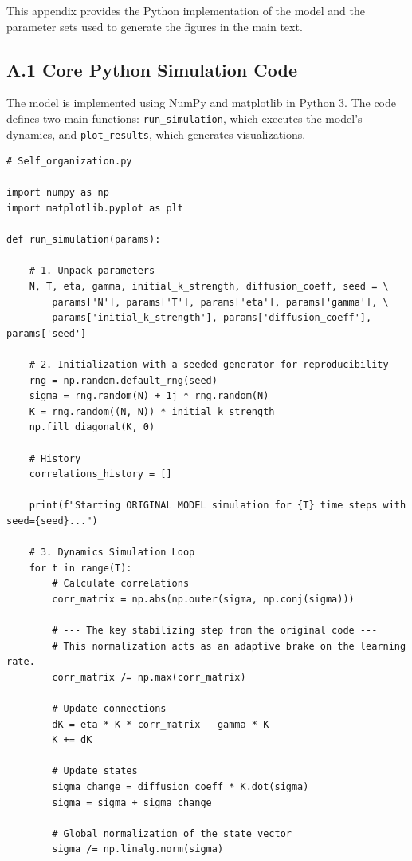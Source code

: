 \documentclass[12pt]{article}
\begin{document}
This appendix provides the Python implementation of the model and the parameter sets used to generate the figures in the main text.

\vspace{1em}

\subsection*{A.1 Core Python Simulation Code}

The model is implemented using NumPy and matplotlib in Python 3. The code defines two main functions: \texttt{run\_simulation}, which executes the model's dynamics, and \texttt{plot\_results}, which generates visualizations.

\begin{verbatim}
# Self_organization.py

import numpy as np
import matplotlib.pyplot as plt

def run_simulation(params):
    
    # 1. Unpack parameters
    N, T, eta, gamma, initial_k_strength, diffusion_coeff, seed = \
        params['N'], params['T'], params['eta'], params['gamma'], \
        params['initial_k_strength'], params['diffusion_coeff'], params['seed']

    # 2. Initialization with a seeded generator for reproducibility
    rng = np.random.default_rng(seed)
    sigma = rng.random(N) + 1j * rng.random(N)
    K = rng.random((N, N)) * initial_k_strength
    np.fill_diagonal(K, 0)

    # History
    correlations_history = []
    
    print(f"Starting ORIGINAL MODEL simulation for {T} time steps with seed={seed}...")

    # 3. Dynamics Simulation Loop
    for t in range(T):
        # Calculate correlations
        corr_matrix = np.abs(np.outer(sigma, np.conj(sigma)))
        
        # --- The key stabilizing step from the original code ---
        # This normalization acts as an adaptive brake on the learning rate.
        corr_matrix /= np.max(corr_matrix)
        
        # Update connections
        dK = eta * K * corr_matrix - gamma * K
        K += dK
        
        # Update states
        sigma_change = diffusion_coeff * K.dot(sigma)
        sigma = sigma + sigma_change
        
        # Global normalization of the state vector
        sigma /= np.linalg.norm(sigma)


\end{verbatim}
\end{document}
